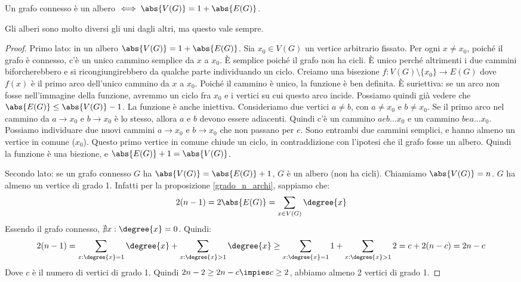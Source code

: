 \begin{prop}
	Un grafo connesso \`e un albero $\iff \abs{V(G)} = 1 + \abs{E(G)}$.
\end{prop}
Gli alberi sono molto diversi gli uni dagli altri, ma questo vale sempre.

\begin{proof}
	Primo lato: in un albero $\abs{V(G)} = 1 + \abs{E(G)}$.
	Sia $x_0 \in V(G)$ un vertice arbitrario fissato.
	Per ogni $x \neq x_0$, poich\'e il grafo \`e connesso, c'\`e un unico cammino semplice da $x$ a $x_0$.
	\`E semplice poich\'e il grafo non ha cicli.
	\`E unico perch\'e altrimenti i due cammini biforcherebbero e si ricongiungirebbero da qualche parte individuando un ciclo.
	Creiamo una bisezione $f: V(G) \setminus \{x_0\} \to E(G)$ dove $f(x)$ \`e il primo arco dell'unico cammino da $x$ a $x_0$.
	Poich\'e il cammino \`e unico, la funzione \`e ben definita.
	\`E suriettiva: se un arco non fosse nell'immagine della funzione, avremmo un ciclo fra $x_0$ e i vertici su cui questo arco incide.
	Possiamo quindi gi\`a vedere che $\abs{E(G)} \le \abs{V(G)} - 1$.
	La funzione \`e anche iniettiva.
	Consideriamo due vertici $a \neq b$, con $a \neq x_0$ e $b \neq x_0$.
	Se il primo arco nel cammino da $a \to x_0$ e $b \to x_0$ \`e lo stesso, allora $a$ e $b$ devono essere adiacenti.
	Quindi c'\`e un cammino $a e b \dots x_0$ e un cammino $b e a \dots x_0$.
	Possiamo individuare due nuovi cammini $a \to x_0$ e $b \to x_0$ che non passano per $e$.
	Sono entrambi due cammini semplici, e hanno almeno un vertice in comune ($x_0$).
	Questo primo vertice in comune chiude un ciclo, in contraddizione con l'ipotesi che il grafo fosse un albero.
	Quindi la funzione \`e una biezione, e $\abs{E(G)} + 1 = \abs{V(G)}$.

	Secondo lato: se un grafo connesso $G$ ha $\abs{V(G)} = \abs{E(G)} + 1$, $G$ \`e un albero (non ha cicli).
	Chiamiamo $\abs{V(G)} = n$.
	$G$ ha almeno un vertice di grado 1.
	Infatti per la proposizione \ref{grado_n_archi}, sappiamo che:
	\[
		2 (n - 1) = 2 \abs{E(G)} = \sum_{x \in V(G)} \degree{x}
	\]
	Essendo il grafo connesso, $\nexists x : \degree{x} = 0$.
	Quindi:
	\begin{align*}
		2 (n-1) =
		\sum_{x : \degree{x} = 1} \degree{x} + \sum_{x : \degree{x} > 1} \degree{x} \ge
		\sum_{x : \degree{x} = 1} 1 + \sum_{x : \degree{x} > 1} 2 =
		c + 2 (n - c) = 2n - c
	\end{align*}
	Dove $c$ \`e il numero di vertici di grado 1.
	Quindi $2n - 2 \ge 2n - c \impies c \ge 2$, abbiamo almeno 2 vertici di grado 1.


\end{proof}
